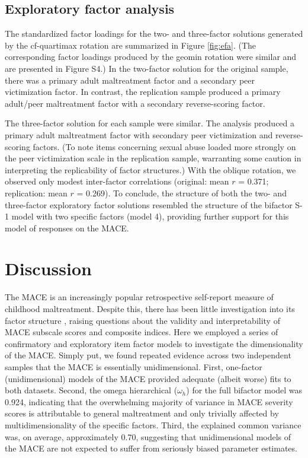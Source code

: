 \documentclass[letterpaper,man,natbib]{apa6}  %
\begin{document}
\subsection{Exploratory factor analysis}

The standardized factor loadings for the two- and three-factor solutions generated by the cf-quartimax rotation are summarized in Figure \ref{fig:efa}. (The corresponding factor loadings produced by the geomin rotation were similar and are presented in Figure S4.) In the two-factor solution for the original sample, there was a primary adult maltreatment factor and a secondary peer victimization factor. In contrast, the replication sample produced a primary adult/peer maltreatment factor with a secondary reverse-scoring factor. 

The three-factor solution for each sample were similar. The analysis produced a primary adult maltreatment factor with secondary peer victimization and reverse-scoring factors. (To note items concerning sexual abuse loaded more strongly on the peer victimization scale in the replication sample, warranting some caution in interpreting the replicability of factor structures.) With the oblique rotation, we observed only modest inter-factor correlations (original: mean $r$ = 0.371; replication: mean $r$ = 0.269). To conclude, the structure of both the two- and three-factor exploratory factor solutions resembled the structure of the bifactor S-1 model with two specific factors (model 4), providing further support for this model of responses on the MACE. 

\section{Discussion}

The MACE is an increasingly popular retrospective self-report measure of childhood maltreatment. Despite this, there has been little investigation into its factor structure \citep{saini2019systematic}, raising questions about the validity and interpretability of MACE subscale scores and composite indices. Here we employed a series of confirmatory and exploratory item factor models to investigate the dimensionality of the MACE. Simply put, we found repeated evidence across two independent samples that the MACE is essentially unidimensional. First, one-factor (unidimensional) models of the MACE provided adequate (albeit worse) fits to both datasets. Second, the omega hierarchical ($\omega_h$) for the full bifactor model was 0.924, indicating that the overwhelming majority of variance  in MACE severity scores is attributable to general maltreatment and only trivially affected by multidimensionality of the specific factors. Third, the explained common variance was, on average, approximately 0.70, suggesting that unidimensional models of the MACE are not expected to suffer from seriously biased parameter estimates. 
\end{document}
